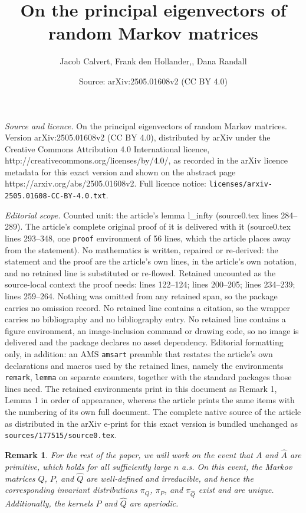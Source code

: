 \documentclass[10pt,a4paper]{amsart}
\title{On the principal eigenvectors of random Markov matrices}
\author{Jacob Calvert, Frank den Hollander,, Dana Randall}
\date{Source: arXiv:2505.01608v2 (CC BY 4.0)}
\newtheorem{remark}{Remark}
\newcommand\wh[1]{\widehat{#1}}
\begin{document}
\maketitle

\noindent\emph{Source and licence.} On the principal eigenvectors of random Markov matrices. Version arXiv:2505.01608v2 (CC BY 4.0), distributed by arXiv under the Creative Commons Attribution 4.0 International licence, http://creativecommons.org/licenses/by/4.0/, as recorded in the arXiv licence metadata for this exact version and shown on the abstract page https://arxiv.org/abs/2505.01608v2. Full licence notice: \texttt{licenses/arxiv-2505.01608-CC-BY-4.0.txt}.\par\smallskip

\noindent\textit{Editorial scope.} Counted unit: the article's lemma l\_infty (source0.tex lines 284--289). The article's complete original proof of it is delivered with it (source0.tex lines 293--348, one \texttt{proof} environment of 56 lines, which the article places away from the statement). No mathematics is written, repaired or re-derived: the statement and the proof are the article's own lines, in the article's own notation, and no retained line is substituted or re-flowed.  Retained uncounted as the source-local context the proof needs: lines 122--124; lines 200--205; lines 234--239; lines 259--264.  Nothing was omitted from any retained span, so the package carries no omission record.  No retained line contains a citation, so the wrapper carries no bibliography and no bibliography entry.  No retained line contains a figure environment, an image-inclusion command or drawing code, so no image is delivered and the package declares no asset dependency.  Editorial formatting only, in addition: an AMS \texttt{amsart} preamble that restates the article's own declarations and macros used by the retained lines, namely the environments \texttt{remark}, \texttt{lemma} on separate counters, together with the standard packages those lines need.  The retained environments print in this document as Remark 1, Lemma 1 in order of appearance, whereas the article prints the same items with the numbering of its own full document.  The complete native source of the article as distributed in the arXiv e-print for this exact version is bundled unchanged as \texttt{sources/177515/source0.tex}.
\begin{remark}\label{rem: A prim}
    For the rest of the paper, we will work on the event that $A$ and $\wh{A}$ are primitive, which holds for all sufficiently large $n$ a.s. On this event, the Markov matrices $Q$, $P$, and $\wh{Q}$ are well-defined and irreducible, and hence the corresponding invariant distributions $\pi_Q$, $\pi_P$, and $\pi_{\wh Q}$ exist and are unique. Additionally, the kernels $P$ and $\wh{Q}$ are aperiodic.
\end{remark}
\end{document}
